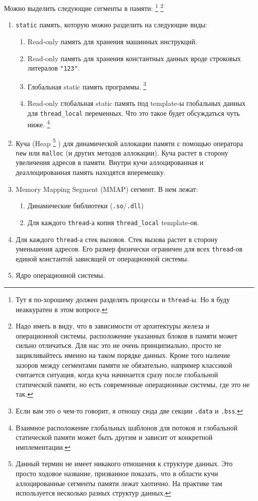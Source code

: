 \documentclass{article}
\begin{document}
Можно выделить следующие сегменты в памяти:%
\footnote{Тут я по-хорошему должен разделять процессы и \verb"thread"-ы.
Но я буду неаккуратен в этом вопросе.}%
\footnote{Надо иметь в виду, что в зависимости от архитектуры железа и операционной системы, расположение указанных блоков в памяти может сильно отличаться.
Для нас это не очень принципиально, просто не зацикливайтесь именно на таком порядке данных.
Кроме того наличие зазоров между сегментами памяти не обязательно, например классикой считается ситуация, когда куча начинается сразу после глобальной статической памяти, но есть современные операционные системы, где это не так.}
\begin{enumerate}
\item \verb"static" память, которую можно разделить на следующие виды:
\begin{enumerate}
\item Read-only память для хранения машинных инструкций.

\item Read-only память для хранения константных данных вроде строковых литералов \verb$"123"$.

\item Глобальная static память программы.%
\footnote{Если вам это о чем-то говорит, я отношу сюда две секции \verb".data" и \verb".bss".}

\item Read-only глобальная static память под template-ы глобальных данных для \verb"thread_local" переменных.
Что это такое будет обсуждаться чуть ниже.%
\footnote{Взаимное расположение глобальных шаблонов для потоков и глобальной статической памяти может быть другим и зависит от конкретной имплементации.}
\end{enumerate}

\item Куча (Heap%
\footnote{Данный термин не имеет никакого отношения к структуре данных.
Это просто ходовое название, призванное показать, что в области кучи аллоцированные сегменты памяти лежат хаотично.
На практике там используется несколько разных структур данных.
}%
) для динамической аллокации памяти с помощью оператора \verb"new" или \verb"malloc" (и других методов аллокации).
Куча растет в сторону увеличения адресов в памяти.
Внутри кучи аллоцированная и деаллоцированная память находятся вперемешку.

\item Memory Mapping Segment (MMAP) сегмент.
В нем лежат:
\begin{enumerate}
\item Динамические библиотеки (\verb".so"/\verb".dll")

\item Для каждого \verb"thread"-а копия \verb"thread_local" template-ов.
\end{enumerate}

\item Для каждого \verb"thread"-а стек вызовов.
Стек вызова растет в сторону уменьшения адресов.
Его размер физически ограничен для всех \verb"thread"-ов единой константой зависящей от операционной системы.

\item Ядро операционной системы.
\end{enumerate}
\end{document}
